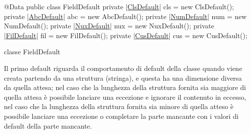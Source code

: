 \documentclass[a4paper,10pt]{report}
\newif\ifesource
\newenvironment{elisting}[1][H]
  {\captionsetup{aboveskip=0pt}\begin{listing}[#1]}
  {\end{listing}%
}
\begin{document}
\ifesource
\begin{figure*}[!htb]
\begin{lstlisting}[language=java, caption=classe FieldDefault, 
label=lst:FieldDefault]
@Data
public class FieldDefault {
    private (*\hyperref[lst:ClsDefault]{ClsDefault}*) cls = new ClsDefault();
    private (*\hyperref[lst:AbcDefault]{AbcDefault}*) abc = new AbcDefault();
    private (*\hyperref[lst:NumDefault]{NumDefault}*) num = new NumDefault();
    private (*\hyperref[lst:NuxDefault]{NuxDefault}*) nux = new NuxDefault();
    private (*\hyperref[lst:FilDefault]{FilDefault}*) fil = new FilDefault();
    private (*\hyperref[lst:CusDefault]{CusDefault}*) cus = new CusDefault();
}
\end{lstlisting}\index{FieldDefault}
\end{figure*}
\else
\begin{elisting}[!htb]
\begin{javacode}
@Data
public class FieldDefault {
    private |\hyperref[lst:ClsDefault]{ClsDefault}| cls = new ClsDefault();
    private |\hyperref[lst:AbcDefault]{AbcDefault}| abc = new AbcDefault();
    private |\hyperref[lst:NumDefault]{NumDefault}| num = new NumDefault();
    private |\hyperref[lst:NuxDefault]{NuxDefault}| nux = new NuxDefault();
    private |\hyperref[lst:FilDefault]{FilDefault}| fil = new FilDefault();
    private |\hyperref[lst:CusDefault]{CusDefault}| cus = new CusDefault();
}
\end{javacode}
\caption{classe FieldDefault}
\label{lst:FieldDefault}
\end{elisting}
\fi
Il primo default riguarda il comportamento di default della classe quando viene 
creata partendo da una struttura (stringa), e questa ha una dimensione diversa 
da quella attesa; nel caso che la lunghezza della struttura fornita sia maggiore 
di quella attesa è possibile lanciare una eccezione e ignorare il contenuto in 
eccesso, nel caso che la lunghezza della struttura fornita sia minore di quella 
atteso è possibile lanciare una eccezione o completare la parte mancante con i 
valori di default della parte mancante.
\end{document}

